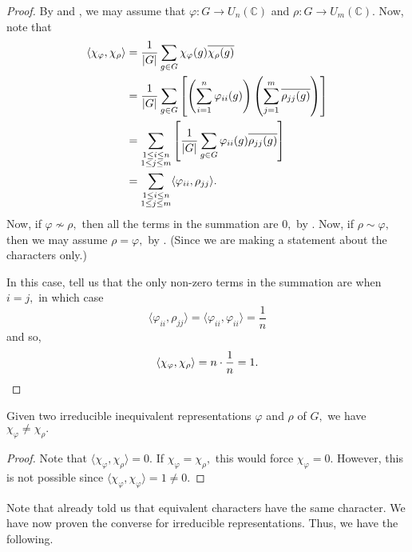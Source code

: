 \begin{proof} 
	By  and , we may assume that $\varphi : G \to U_n(\mathbb{C})$ and $\rho : G \to U_m(\mathbb{C}).$ Now, note that
	\begin{align*} 
		\langle \chi_\varphi, \chi_\rho\rangle &= \frac{1}{{\left\lvert G \right\lvert}}\sum_{g \in G} \chi_\varphi(g) \overline{\chi_\rho(g)}\\
		&= \frac{1}{{\left\lvert G \right\lvert}}\sum_{g \in G}\left[\left(\sum_{i = 1}^{n}\varphi_{ii}(g)\right)\left(\sum_{j = 1}^{m}\overline{\rho_{jj}(g)}\right)\right]\\
		&= \sum_{\substack{1 \le i \le n\\1 \le j \le m}}\left[\dfrac{1}{{\left\lvert G \right\lvert}}\sum_{g \in G}\varphi_{ii}(g)\overline{\rho_{jj}(g)}\right]\\
		&= \sum_{\substack{1 \le i \le n\\1 \le j \le m}}\langle \varphi_{ii}, \rho_{jj}\rangle.
	\end{align*}
	Now, if $\varphi \not\sim \rho,$ then all the terms in the summation are $0,$ by . Now, if $\rho \sim \varphi,$ then we may assume $\rho = \varphi,$ by . (Since we are making a statement about the characters only.)

	In this case,  tell us that the only non-zero terms in the summation are when $i = j,$ in which case
	\begin{equation*} 
		\langle \varphi_{ii}, \rho_{jj}\rangle = \langle \varphi_{ii}, \varphi_{ii}\rangle = \frac{1}{n}
	\end{equation*}
	and so,
	\begin{equation*} 
		\langle \chi_\varphi, \chi_\rho\rangle = n\cdot\frac{1}{n} = 1.	 \qedhere
	\end{equation*}
\end{proof}

\begin{cor}
	Given two irreducible inequivalent representations $\varphi$ and $\rho$ of $G,$ we have $\chi_\varphi \neq \chi_\rho.$
\end{cor}
\begin{proof} 
	Note that $\langle \chi_\varphi, \chi_\rho\rangle = 0.$ If $\chi_\varphi = \chi_\rho,$ this would force $\chi_\varphi = 0.$ However, this is not possible since $\langle \chi_\varphi, \chi_\varphi\rangle = 1 \neq 0.$
\end{proof}
Note that  already told us that equivalent characters have the same character. We have now proven the converse for irreducible representations. Thus, we have the following.

